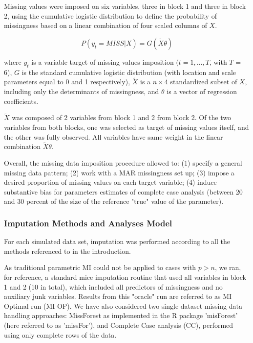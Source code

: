 Missing values were imposed on six variables, three in block 1 and three in block 2, using the cumulative logistic distribution
to define the probability of missingness based on a linear combination of four scaled columns of $X$.

\begin{equation}
	P(y_t = MISS | X) = G(\tilde{X} \theta) \label{eq:PBT_imp}
\end{equation}

where $y_t$ is a variable target of missing values imposition ($t = 1,...,T$, with $T$ = 6), $G$ is the standard cumulative logistic distribution 
(with location and scale parameters equal to 0 and 1 respectively), $\tilde{X}$ is a $n \times 4$ standardized subset of $X$, 
including only the determinants of missingness, and $\theta$ is a vector of regression coefficients. 

$\tilde{X}$ was composed of 2 variables from block 1 and 2 from block 2. Of the two variables from both blocks,
one was selected as target of missing values itself, and the other was fully observed. All variables have same weight
in the linear combination $\tilde{X}\theta$.

\iffalse %
The value of the linear predictor was also "off-setted" to induce missingness in the lower tail of the distribution
of linear predictor $\tilde{X}\theta$. This procedure does not imply that missingness in the target variable depends 
on the target variable itself, as the offset is applied based on the values of $\tilde{X}$.
\fi

Overall, the missing data imposition procedure allowed to: 
(1) specify a general missing data pattern; 
(2) work with a MAR missingness set up;
(3) impose a desired proportion of missing values on each target variable; 
(4) induce substantive bias for parameters estimates of complete case analysis (between 20 and 30 percent of 
the size of the reference "true" value of the parameter).

\subsubsection{Imputation Methods and Analyses Model}

For each simulated data set, imputation was performed according to all the methods referenced to in the introduction.

As traditional parametric MI could not be applied to cases with $p > n$, we ran, for reference, a standard mice imputation 
routine that used all variables in block 1 and 2 (10 in total), which included all predictors of missingness and no 
auxiliary junk variables. Results from this "oracle" run are referred to as MI Optimal run (MI-OP). 
We have also considered two single dataset missing data handling approaches: MissForest \citep{stekhovenBuhlmann:2011} as 
implemented in the R package 'misForest' (here referred to as 'missFor'), and Complete Case analysis (CC), performed 
using only complete rows of the data.


